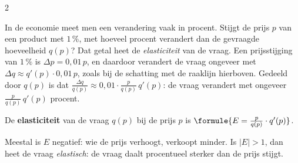 \begin{oefeningen}
\end{oefeningen}
\begin{alleenvoor}{2}

In de economie meet men een verandering vaak in procent. Stijgt de prijs $p$ van een product met $1\,\%$, met hoeveel procent verandert dan de gevraagde hoeveelheid $q(p)$? Dat getal heet de \textit{elasticiteit} van de vraag. Een prijsstijging van $1\,\%$ is $\Delta p = 0{,}01\,p$, en daardoor verandert de vraag ongeveer met $\Delta q \approx q'(p) \cdot 0{,}01\,p$, zoals bij de schatting met de raaklijn hierboven. Gedeeld door $q(p)$ is dat $\frac{\Delta q}{q(p)} \approx 0{,}01 \cdot \frac{p}{q(p)}\,q'(p)$: de vraag verandert met ongeveer $\frac{p}{q(p)}\,q'(p)$ procent.

\begin{theorie}
De \textbf{\textcolor{accent}{elasticiteit}} van de vraag $q(p)$ bij de prijs $p$ is \quad $\formule{E = \frac{p}{q(p)} \cdot q'(p)}$.
\end{theorie}

Meestal is $E$ negatief: wie de prijs verhoogt, verkoopt minder. Is $|E| > 1$, dan heet de vraag \textit{elastisch}: de vraag daalt procentueel sterker dan de prijs stijgt.


\begin{oefeningen}
\end{oefeningen}
\end{alleenvoor}
